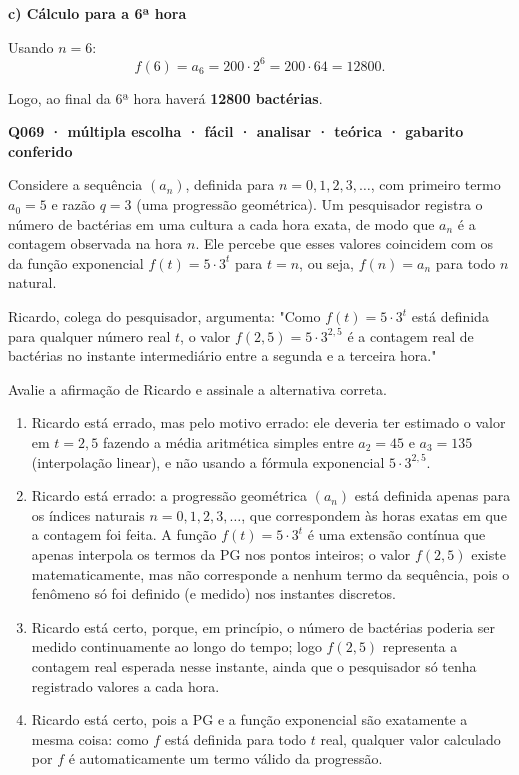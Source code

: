 \documentclass[11pt,a4paper]{article}
\begin{document}
\textbf{c) Cálculo para a 6ª hora}

Usando $n=6$:
$$f(6) = a_6 = 200 \cdot 2^{6} = 200 \cdot 64 = 12800.$$

Logo, ao final da 6ª hora haverá \textbf{12800 bactérias}.

\bigskip\noindent\textbf{Q069 · múltipla escolha · fácil · analisar · teórica · gabarito conferido}\par\nopagebreak
Considere a sequência $(a_n)$, definida para $n = 0, 1, 2, 3, \ldots$, com primeiro termo $a_0 = 5$ e razão $q = 3$ (uma progressão geométrica). Um pesquisador registra o número de bactérias em uma cultura a cada hora exata, de modo que $a_n$ é a contagem observada na hora $n$. Ele percebe que esses valores coincidem com os da função exponencial $f(t) = 5 \cdot 3^t$ para $t = n$, ou seja, $f(n) = a_n$ para todo $n$ natural.

Ricardo, colega do pesquisador, argumenta: "Como $f(t)=5\cdot 3^t$ está definida para qualquer número real $t$, o valor $f(2{,}5) = 5\cdot 3^{2{,}5}$ é a contagem real de bactérias no instante intermediário entre a segunda e a terceira hora."

Avalie a afirmação de Ricardo e assinale a alternativa correta.
\begin{enumerate}[label=(\alph*)]
\item Ricardo está errado, mas pelo motivo errado: ele deveria ter estimado o valor em $t=2{,}5$ fazendo a média aritmética simples entre $a_2=45$ e $a_3=135$ (interpolação linear), e não usando a fórmula exponencial $5\cdot3^{2,5}$.
\item Ricardo está errado: a progressão geométrica $(a_n)$ está definida apenas para os índices naturais $n=0,1,2,3,\ldots$, que correspondem às horas exatas em que a contagem foi feita. A função $f(t)=5\cdot3^t$ é uma extensão contínua que apenas interpola os termos da PG nos pontos inteiros; o valor $f(2{,}5)$ existe matematicamente, mas não corresponde a nenhum termo da sequência, pois o fenômeno só foi definido (e medido) nos instantes discretos.
\item Ricardo está certo, porque, em princípio, o número de bactérias poderia ser medido continuamente ao longo do tempo; logo $f(2{,}5)$ representa a contagem real esperada nesse instante, ainda que o pesquisador só tenha registrado valores a cada hora.
\item Ricardo está certo, pois a PG e a função exponencial são exatamente a mesma coisa: como $f$ está definida para todo $t$ real, qualquer valor calculado por $f$ é automaticamente um termo válido da progressão.
\end{enumerate}
\end{document}
